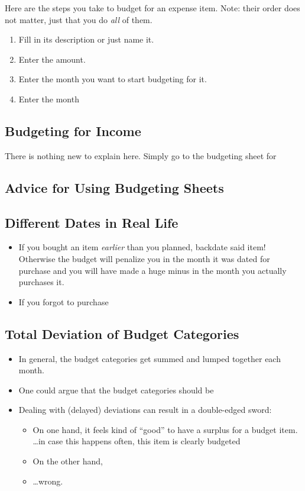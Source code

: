 Here are the steps you take to budget for an expense item.
Note: their order does not matter, just that you do \emph{all} of them.
\begin{enumerate}
	\item Fill in its description or just name it.
	\item Enter the amount.
	\item Enter the month you want to start budgeting for it.
	\item Enter the month 
\end{enumerate}

\subsection{Budgeting for Income}
\label{subsec:budgeting-income}

There is nothing new to explain here.
Simply go to the budgeting sheet for 

\subsection{Advice for Using Budgeting Sheets}
\label{subsec:advice-budgeting-sheets}

\subsection{Different Dates in Real Life}
\label{subsec:Different-Dates}

\begin{itemize}
	\item If you bought an item \emph{earlier} than you planned, backdate said item! Otherwise the budget will penalize you in the month it was dated for purchase and you will have made a huge minus in the month you actually purchases it.
	\item If you forgot to purchase 
\end{itemize}

\subsection{Total Deviation of Budget Categories}
\label{subsec:Total-Deviation}

\begin{itemize}
	\item In general, the budget categories get summed and lumped together each month.
	\item One could argue that the budget categories should be 
	\item Dealing with (delayed) deviations can result in a double-edged sword:
	\begin{itemize}
		\item On one hand, it feels kind of ``good'' to have a surplus for a budget item.\\
		\ldots in case this happens often, this item is clearly budgeted
		\item On the other hand, 
		\item \ldots  wrong.
	\end{itemize}
\end{itemize}



